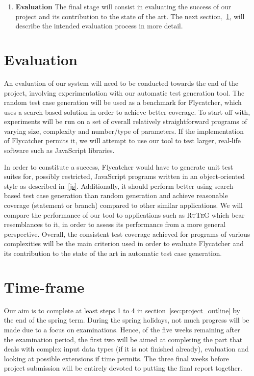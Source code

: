 \documentclass[a4paper,11pt,titlepage]{report}
\begin{document}
\begin{enumerate}
	\item{\textbf{Evaluation}}
	The final stage will consist in evaluating the success of our project and its contribution to the state of the art. The next section,~\ref{sec:evaluation}, will describe the intended evaluation process in more detail.

\end{enumerate}

\section{Evaluation}
\label{sec:evaluation}
An evaluation of our system will need to be conducted towards the end of the project, involving experimentation with our automatic test generation tool. The random test case generation will be used as a benchmark for \textsf{Flycatcher}, which uses a search-based solution in order to achieve better coverage. To start off with, experiments will be run on a set of overall relatively straightforward programs of varying size, complexity and number/type of parameters. If the implementation of \textsf{Flycatcher} permits it, we will attempt to use our tool to test larger, real-life software such as JavaScript libraries.

In order to constitute a success, \textsf{Flycatcher} would have to generate unit test suites for, possibly restricted, JavaScript programs written in an object-oriented style as described in~\ref{js}. Additionally, it should perform better using search-based test case generation than random generation and achieve reasonable coverage (statement or branch) compared to other similar applications. We will compare the performance of our tool to applications such as \textsc{RuTeG} which bear resemblances to it, in order to assess its performance from a more general perspective. Overall, the consistent test coverage achieved for programs of various complexities will be the main criterion used in order to evaluate \textsf{Flycatcher} and its contribution to the state of the art in automatic test case generation.

\section{Time-frame}
Our aim is to complete at least steps 1 to 4 in section~\ref{sec:project_outline} by the end of the spring term. During the spring holidays, not much progress will be made due to a focus on examinations. Hence, of the five weeks remaining after the examination period, the first two will be aimed at completing the part that deals with complex input data types (if it is not finished already), evaluation and looking at possible extensions if time permits. The three final weeks before project submission will be entirely devoted to putting the final report together.



\end{document}
